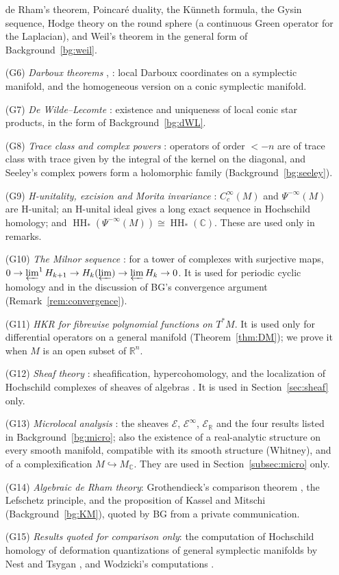 \documentclass[11pt,oneside,reqno]{article}
\DeclareMathOperator{\HH}{HH}
\newcommand{\C}{\mathbb C}
\newcommand{\R}{\mathbb R}
\newcommand{\cE}{\mathcal E}
\newcommand{\CI}{C^\infty}
\theoremstyle{plain}
\theoremstyle{definition}
\theoremstyle{remark}
\begin{document}
\begin{enumerate}
de Rham's theorem, Poincaré duality, the Künneth formula, the Gysin
sequence, Hodge theory on the round sphere (a continuous Green operator
for the Laplacian), and Weil's theorem in the general form of
Background~\ref{bg:weil}.
\item[(G6)] \emph{Darboux theorems} \cite{CannasdaSilva},
\cite[\S21.1]{Hormander3}: local Darboux coordinates on a symplectic
manifold, and the homogeneous version on a conic symplectic manifold.
\item[(G7)] \emph{De Wilde--Lecomte} \cite{deWildeLecomte}: existence and
uniqueness of local conic star products, in the form of
Background~\ref{bg:dWL}.
\item[(G8)] \emph{Trace class and complex powers} \cite{Seeley,Shubin}:
operators of order \(<-n\) are of trace class with trace given by the
integral of the kernel on the diagonal, and Seeley's complex powers form
a holomorphic family (Background~\ref{bg:seeley}).
\item[(G9)] \emph{H-unitality, excision and Morita invariance}
\cite{Wodzicki-excision,Loday}: \(\CI_c(M)\) and \(\Psi^{-\infty}(M)\) are H-unital;
an H-unital ideal gives a long exact sequence in Hochschild homology; and
\(\HH_*(\Psi^{-\infty}(M))\cong\HH_*(\C)\). These are used only in remarks.
\item[(G10)] \emph{The Milnor sequence} \cite[\S3.5]{Weibel}: for a tower of
complexes with surjective maps, \(0\to\varprojlim^1H_{k+1}\to H_k(\varprojlim)\to\varprojlim H_k\to0\). It is
used for periodic cyclic homology and in the discussion of BG's convergence
argument (Remark~\ref{rem:convergence}).
\item[(G11)] \emph{HKR for fibrewise polynomial functions on \(T^*M\)}. It
is used only for differential operators on a general manifold
(Theorem~\ref{thm:DM}); we prove it when \(M\) is an open subset of \(\R^n\).
\item[(G12)] \emph{Sheaf theory} \cite{BottTu,Bredon}: sheafification,
hypercohomology, and the localization of Hochschild complexes of sheaves
of algebras \cite{Teleman,Brylinski-examples}. It is used in
Section~\ref{sec:sheaf} only.
\item[(G13)] \emph{Microlocal analysis} \cite{SKK,Kashiwara-book,KashiwaraKawai,Brylinski-examples}:
the sheaves \(\cE\), \(\cE^\infty\), \(\cE_{\R}\) and the four results listed
in Background~\ref{bg:micro}; also the existence of a real-analytic structure on
every smooth manifold, compatible with its smooth structure (Whitney), and of a
complexification \(M\hookrightarrow M_{\C}\). They are used in Section~\ref{subsec:micro}
only.
\item[(G14)] \emph{Algebraic de Rham theory}: Grothendieck's comparison
theorem \cite{Grothendieck}, the Lefschetz principle, and the proposition of
Kassel and Mitschi \cite{KasselMitschi} (Background~\ref{bg:KM}), quoted by
BG from a private communication.
\item[(G15)] \emph{Results quoted for comparison only}: the computation of
Hochschild homology of deformation quantizations of general symplectic
manifolds by Nest and Tsygan \cite{NestTsygan}, and Wodzicki's computations
\cite{Wodzicki-residue,Wodzicki-cyclic}.
\end{enumerate}
\end{document}
